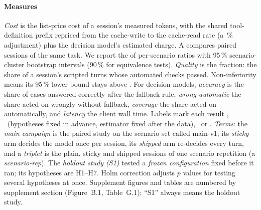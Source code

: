 \paragraph{Measures} \emph{Cost} is the list-price cost of a session's measured tokens, with the shared
tool-definition prefix repriced from the cache-write to the cache-read rate (a \NormShareMain\,\% adjustment) plus the
decision model's estimated charge. A  compares paired sessions of the same task. We report the
 of per-scenario ratios with 95\,\% scenario-cluster bootstrap intervals (90\,\% for
equivalence tests). \emph{Quality} is the  fraction: the share of a session's scripted turns whose
automated checks passed. Non-inferiority means its 95\,\% lower bound stays above \NIMargin. For decision models,
\emph{accuracy} is the share of cases answered correctly after the fallback rule, \emph{wrong automatic} the share
acted on wrongly without fallback, \emph{coverage} the share acted on automatically, and \emph{latency} the client
wall time. Labels mark each result \prereg, \confpost\ (hypotheses fixed in advance, estimator fixed after the data), \posthoc\
or \expl. \emph{Terms}: the \emph{main campaign} is the paired study on the scenario set called main-v1; its
\emph{sticky} arm decides the model once per session, its \emph{shipped} arm re-decides every turn, and a
\emph{triplet} is the plain, sticky and shipped sessions of one scenario repetition (a \emph{scenario-rep}). The
\emph{holdout study (S1)} tested a \emph{frozen configuration} fixed before it ran; its hypotheses are H1--H7. Holm
correction adjusts $p$ values for testing several hypotheses at once. Supplement figures and tables are numbered by supplement section (Figure~B.1, Table~G.1); ``S1'' always means the
holdout study.
